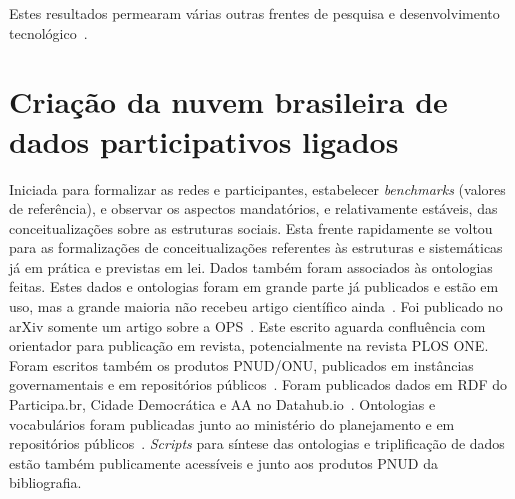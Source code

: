 \documentclass[a4paper,openright,12pt]{report} %
\begin{document}
Estes resultados permearam várias outras frentes 
de pesquisa e desenvolvimento tecnológico~\cite{pnud3,pnud4,pnud5,ops,versinus}.

\section{Criação da nuvem brasileira de dados participativos ligados}
Iniciada para formalizar as redes e participantes, estabelecer
\emph{benchmarks} (valores de referência), e observar
os aspectos mandatórios, e relativamente estáveis,
das conceitualizações sobre as estruturas sociais.
Esta frente rapidamente se voltou para
as formalizações de conceitualizações referentes às estruturas
e sistemáticas já em prática e previstas em lei.
Dados também foram associados às ontologias
feitas. Estes dados e ontologias foram em grande parte
já publicados e estão em uso, mas a grande maioria não
recebeu artigo científico ainda~\cite{ops,pnud5,pnud4,pnud3,ensaio}.
Foi publicado no arXiv somente um artigo sobre a OPS~\cite{ops}.
Este escrito aguarda confluência com orientador para publicação em revista, potencialmente na revista PLOS ONE.
Foram escritos também os produtos PNUD/ONU,
publicados em instâncias governamentais
e em repositórios públicos~\cite{pnud3,pnud4,pnud5}.
Foram publicados dados em RDF do Participa.br, Cidade
Democrática e AA no Datahub.io~\cite{datahub}.
Ontologias e vocabulários foram publicadas junto ao ministério do planejamento
e em repositórios públicos~\cite{pnud5}.
\emph{Scripts} para síntese das ontologias e triplificação
de dados estão também publicamente acessíveis
e junto aos produtos PNUD da bibliografia.
\end{document}
